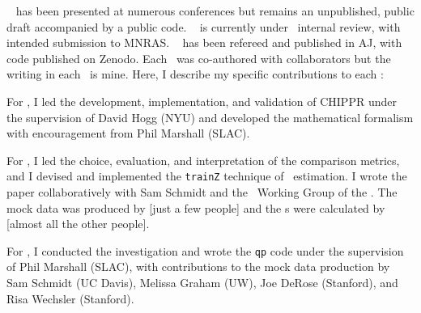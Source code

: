 
\chapname~ has been presented at numerous conferences but remains an unpublished, public draft accompanied by a public code.
\chapname~ is currently under \desc\ internal review, with intended submission to MNRAS.
\chapname~ has been refereed and published in AJ, with code published on Zenodo.
Each \chapname\ was co-authored with collaborators but the writing in each \chapname\ is mine.
Here, I describe my specific contributions to each \chapname:
\begin{enumerate}

{\item For , I led the development, implementation, and validation of CHIPPR under the supervision of David Hogg (NYU) and developed the mathematical formalism with encouragement from Phil Marshall (SLAC).}

{\item For , I led the choice, evaluation, and interpretation of the comparison metrics, and I devised and implemented the \texttt{trainZ} technique of \pzpdf\ estimation.
I wrote the paper collaboratively with Sam Schmidt and the \Pz\ Working Group of the \desc.
The mock data was produced by [just a few people] and the \pzpdf s were calculated by [almost all the other people].}

{\item For , I conducted the investigation and wrote the \texttt{qp} code under the supervision of Phil Marshall (SLAC), with contributions to the mock data production by Sam Schmidt (UC Davis), Melissa Graham (UW), Joe DeRose (Stanford), and Risa Wechsler (Stanford).}

\end{enumerate}
